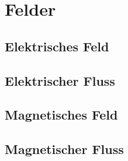 \chapter{Felder}

\section{Elektrisches Feld}

\section{Elektrischer Fluss}

\section{Magnetisches Feld}

\section{Magnetischer Fluss}